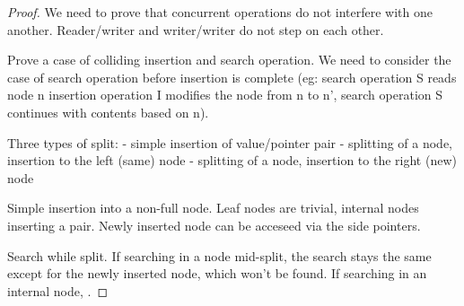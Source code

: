 \begin{proof}
  We need to prove that concurrent operations do not interfere with one another. Reader/writer and writer/writer do not step on each other.

  Prove a case of colliding insertion and search operation. We need to consider the case of search operation before insertion is complete (eg: search operation S reads node n insertion operation I modifies the node from n to n', search operation S continues with contents based on n).

  Three types of split:
  - simple insertion of value/pointer pair
  - splitting of a node, insertion to the left (same) node
  - splitting of a node, insertion to the right (new) node

  Simple insertion into a non-full node. Leaf nodes are trivial, internal nodes inserting a pair. Newly inserted node can be acceseed via the side pointers.

  Search while split. If searching in a node mid-split, the search stays the same except for the newly inserted node, which won't be found. If searching in an internal node, .

\end{proof}

